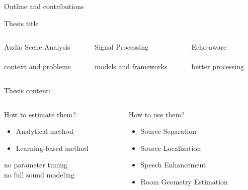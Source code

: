 \begin{frame}{Outline and contributions}

    \begin{block}{Thesis title}

        \vspace*{2mm}
        \begin{columns}[onlytextwidth]
            \begin{column}[T]{0.3\linewidth}
                \centering
                \alert{Audio Scene Analysis}
                \\\downarrow
                \\context and problems
            \end{column}\hfill\pause
            \begin{column}[T]{0.3\linewidth}
                \centering
                \alert{Signal Processing}
                \\\downarrow
                \\models and frameworks
            \end{column}\hfill\pause
            \begin{column}[T]{0.3\linewidth}
                \centering
                \alert{Echo-aware}
                \\\downarrow
                \\better processing
            \end{column}\hfill
        \end{columns}
    \end{block}
    \pause

    \vfill
    \begin{block}{Thesis content:}

        \vspace*{2mm}
        \begin{columns}[T,onlytextwidth]
        \begin{column}{0.48\textwidth}
            \centering
            \alert{How to estimate them?}
            \begin{itemize}
                \item Analytical method
                \item Learning-based method
            \end{itemize}
            {\small no parameter tuning
            \\no full sound modeling}
        \end{column}
        \begin{column}{0.48\textwidth}
            \centering
            \alert{How to use them?}
            \begin{itemize}
                \item Source Separation
                \item Source Localization
                \item Speech Enhancement
                \item Room Geometry Estimation
            \end{itemize}
        \end{column}
    \end{columns}


\end{block}
\end{frame}
